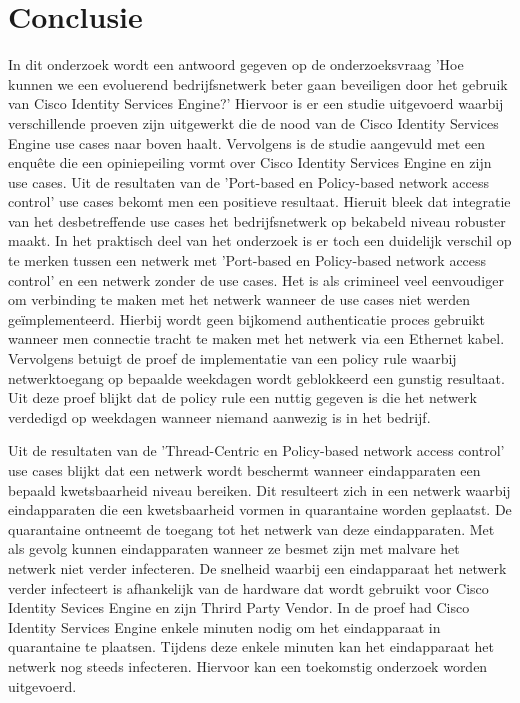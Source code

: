 
\chapter{Conclusie}
\label{ch:conclusie}

In dit onderzoek wordt een antwoord gegeven op de onderzoeksvraag 'Hoe kunnen we een evoluerend bedrijfsnetwerk beter gaan beveiligen door het gebruik van Cisco Identity Services Engine?' Hiervoor is er een studie uitgevoerd waarbij verschillende proeven zijn uitgewerkt die de nood van de Cisco Identity Services Engine use cases naar boven haalt. Vervolgens is de studie aangevuld met een enquête die een opiniepeiling vormt over Cisco Identity Services Engine en zijn use cases.
\newline
\newline
Uit de resultaten van de 'Port-based en Policy-based network access control' use cases bekomt men een positieve resultaat. Hieruit bleek dat integratie van het desbetreffende use cases het bedrijfsnetwerk op bekabeld niveau robuster maakt. In het praktisch deel van het onderzoek is er toch een duidelijk verschil op te merken tussen een netwerk met 'Port-based en Policy-based network access control' en een netwerk zonder de use cases. Het is als crimineel veel eenvoudiger om verbinding te maken met het netwerk wanneer de use cases niet werden geïmplementeerd. Hierbij wordt geen bijkomend authenticatie proces gebruikt wanneer men connectie tracht te maken met het netwerk via een Ethernet kabel. Vervolgens betuigt de proef de implementatie van een policy rule waarbij netwerktoegang op bepaalde weekdagen wordt geblokkeerd een gunstig resultaat. Uit deze proef blijkt dat de policy rule een nuttig gegeven is die het netwerk verdedigd op weekdagen wanneer niemand aanwezig is in het bedrijf.

Uit de resultaten van de 'Thread-Centric en Policy-based network access control' use cases blijkt dat een netwerk wordt beschermt wanneer eindapparaten een bepaald kwetsbaarheid niveau bereiken. Dit resulteert zich in een netwerk waarbij eindapparaten die een kwetsbaarheid vormen in quarantaine worden geplaatst. De quarantaine ontneemt de toegang tot het netwerk van deze eindapparaten. Met als gevolg kunnen eindapparaten wanneer ze besmet zijn met malvare het netwerk niet verder infecteren. 
\newline
\newline
De snelheid waarbij een eindapparaat het netwerk verder infecteert is afhankelijk van de hardware dat wordt gebruikt voor Cisco Identity Sevices Engine en zijn Thrird Party Vendor. In de proef had Cisco Identity Services Engine enkele minuten nodig om het eindapparaat in quarantaine te plaatsen. Tijdens deze enkele minuten kan het eindapparaat het netwerk nog steeds infecteren. Hiervoor kan een toekomstig onderzoek worden uitgevoerd.


